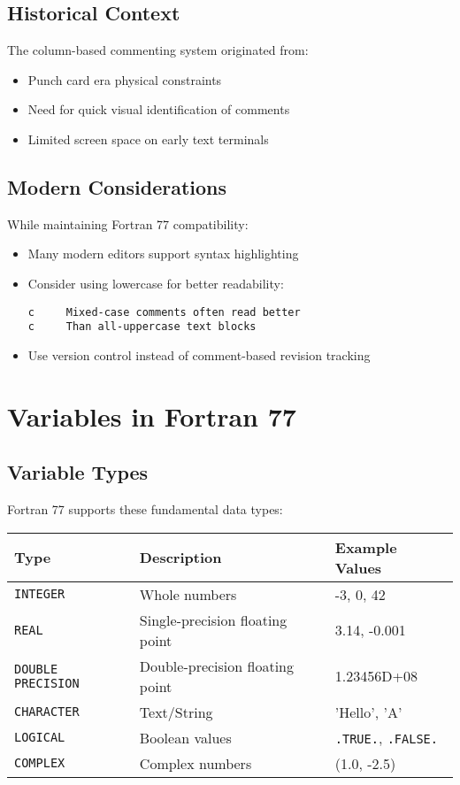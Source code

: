 \documentclass{book}
\begin{document}
\subsection*{Historical Context}
The column-based commenting system originated from:
\begin{itemize}
    \item Punch card era physical constraints
    \item Need for quick visual identification of comments
    \item Limited screen space on early text terminals
\end{itemize}

\subsection*{Modern Considerations}
While maintaining Fortran 77 compatibility:
\begin{itemize}
    \item Many modern editors support syntax highlighting
    \item Consider using lowercase for better readability:
    \begin{verbatim}
c     Mixed-case comments often read better
c     Than all-uppercase text blocks
    \end{verbatim}
    \item Use version control instead of comment-based revision tracking
\end{itemize}

\section{Variables in Fortran 77}

\subsection*{Variable Types}
Fortran 77 supports these fundamental data types:
\begin{center}
\begin{tabular}{|l|l|l|}
\hline
\textbf{Type} & \textbf{Description} & \textbf{Example Values} \\ 
\hline
\texttt{INTEGER} & Whole numbers & -3, 0, 42 \\
\texttt{REAL} & Single-precision floating point & 3.14, -0.001 \\
\texttt{DOUBLE PRECISION} & Double-precision floating point & 1.23456D+08 \\
\texttt{CHARACTER} & Text/String & 'Hello', 'A' \\
\texttt{LOGICAL} & Boolean values & \texttt{.TRUE.}, \texttt{.FALSE.} \\
\texttt{COMPLEX} & Complex numbers & (1.0, -2.5) \\
\hline
\end{tabular}
\end{center}
\end{document}
